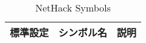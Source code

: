 {
\small
\begin{longtable}{lll}
\caption[]{NetHack Symbols}\\
標準設定                     & シンボル名                 & 説明\\
\hline \hline
\endhead

\end{longtable}}

